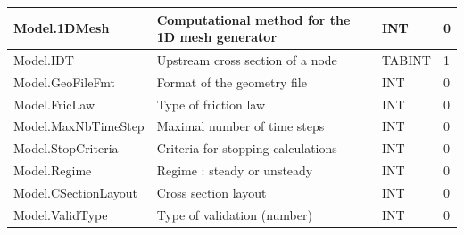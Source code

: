 \documentclass[a4paper,11pt]{article}
\begin{document}
\begin{landscape}
\begin{table}[ht]
\begin{center}
\begin{tabular}{|l|l|l|l|}
\hline  Model.1DMesh & Computational method for the 1D mesh generator & INT & 0 \\
\hline  Model.IDT & Upstream cross section of a node & TABINT & 1 \\
\hline  Model.GeoFileFmt & Format of the geometry file & INT & 0 \\
\hline  Model.FricLaw & Type of friction law & INT & 0 \\
\hline  Model.MaxNbTimeStep & Maximal number of time steps & INT & 0 \\
\hline  Model.StopCriteria & Criteria for stopping calculations & INT & 0 \\
\hline  Model.Regime & Regime : steady or unsteady & INT & 0 \\
\hline  Model.CSectionLayout & Cross section layout & INT & 0 \\
\hline  Model.ValidType & Type of validation (number) & INT & 0 \\
\hline

\end{tabular} 
\end{center}
\end{table}
\begin{table}[ht]
\begin{center}
\begin{tabular}{|l|l|l|l|}


\end{tabular}
\end{center}
\end{table}
\end{landscape}
\end{document}
